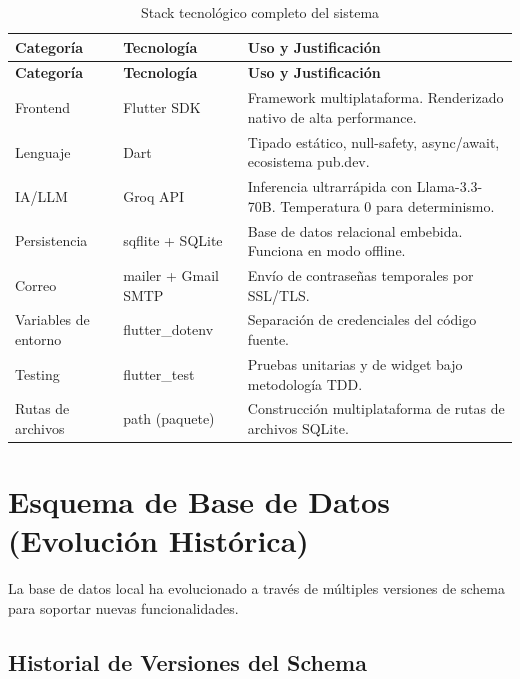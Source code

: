 \documentclass[12pt,a4paper]{article}
\begin{document}
\begin{longtable}{p{3.5cm} p{3.5cm} p{7cm}}
\caption{Stack tecnológico completo del sistema} \label{tab:stack} \\
\toprule
\textbf{Categoría} & \textbf{Tecnología} & \textbf{Uso y Justificación} \\
\midrule
\endfirsthead
\toprule
\textbf{Categoría} & \textbf{Tecnología} & \textbf{Uso y Justificación} \\
\midrule
\endhead
\bottomrule
\endlastfoot
Frontend & Flutter SDK & Framework multiplataforma. Renderizado nativo de alta performance. \\[0.3em]
Lenguaje & Dart & Tipado estático, null-safety, async/await, ecosistema pub.dev. \\[0.3em]
IA/LLM & Groq API & Inferencia ultrarrápida con Llama-3.3-70B. Temperatura 0 para determinismo. \\[0.3em]
Persistencia & sqflite + SQLite & Base de datos relacional embebida. Funciona en modo offline. \\[0.3em]
Correo & mailer + Gmail SMTP & Envío de contraseñas temporales por SSL/TLS. \\[0.3em]
Variables de entorno & flutter\_dotenv & Separación de credenciales del código fuente. \\[0.3em]
Testing & flutter\_test & Pruebas unitarias y de widget bajo metodología TDD. \\[0.3em]
Rutas de archivos & path (paquete) & Construcción multiplataforma de rutas de archivos SQLite. \\
\end{longtable}

\section{Esquema de Base de Datos (Evolución Histórica)}

La base de datos local ha evolucionado a través de múltiples versiones de schema para
soportar nuevas funcionalidades.

\subsection{Historial de Versiones del Schema}
\end{document}
